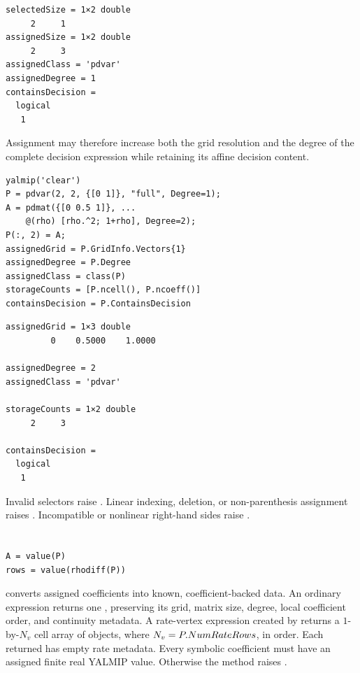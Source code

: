 \begin{lstlisting}[style=dpoutput]
selectedSize = 1×2 double
     2     1
assignedSize = 1×2 double
     2     3
assignedClass = 'pdvar'
assignedDegree = 1
containsDecision =
  logical
   1
\end{lstlisting}

Assignment may therefore increase both the grid resolution and the degree of the complete decision expression while retaining its affine decision content.

\begin{lstlisting}[style=dpmatlab]
yalmip('clear')
P = pdvar(2, 2, {[0 1]}, "full", Degree=1);
A = pdmat({[0 0.5 1]}, ...
    @(rho) [rho.^2; 1+rho], Degree=2);
P(:, 2) = A;
assignedGrid = P.GridInfo.Vectors{1}
assignedDegree = P.Degree
assignedClass = class(P)
storageCounts = [P.ncell(), P.ncoeff()]
containsDecision = P.ContainsDecision
\end{lstlisting}

\begin{lstlisting}[style=dpoutput]
assignedGrid = 1×3 double
         0    0.5000    1.0000

assignedDegree = 2
assignedClass = 'pdvar'

storageCounts = 1×2 double
     2     3

containsDecision =
  logical
   1
\end{lstlisting}

Invalid selectors raise .  Linear indexing, deletion, or non-parenthesis assignment raises . Incompatible or nonlinear right-hand sides raise .
\section{\texorpdfstring{}{value}}
\label{sec:pdvar-value}

\syntaxhead
\begin{lstlisting}[style=dpsyntax]
A = value(P)
rows = value(rhodiff(P))
\end{lstlisting}

 converts assigned  coefficients into known, coefficient-backed  data. An ordinary expression returns one , preserving its grid, matrix size, degree, local coefficient order, and continuity metadata. A rate-vertex expression created by  returns a $1$-by-$N_v$ cell array of  objects, where $N_v=P.NumRateRows$, in  order. Each returned  has empty rate metadata. Every symbolic coefficient must have an assigned finite real YALMIP value. Otherwise the method raises .

